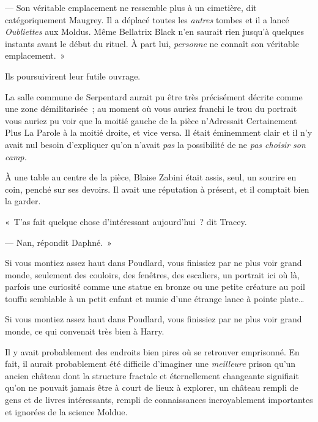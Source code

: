 --- Son véritable emplacement ne ressemble plus à un cimetière, dit catégoriquement Maugrey. Il a déplacé toutes les \emph{autres} tombes et il a lancé \emph{Oubliettes} aux Moldus. Même Bellatrix Black n'en saurait rien jusqu'à quelques instants avant le début du rituel. À part lui, \emph{personne} ne connaît son véritable emplacement.~»

Ils poursuivirent leur futile ouvrage.


La salle commune de Serpentard aurait pu être très précisément décrite comme une zone démilitarisée~; au moment où vous auriez franchi le trou du portrait vous auriez pu voir que la moitié gauche de la pièce n'Adressait Certainement Plus La Parole à la moitié droite, et vice versa. Il était éminemment clair et il n'y avait nul besoin d'expliquer qu'on n'avait \emph{pas} la possibilité de ne \emph{pas choisir son camp.}

À une table au centre de la pièce, Blaise Zabini était assis, seul, un sourire en coin, penché sur ses devoirs. Il avait une réputation à présent, et il comptait bien la garder.




«~T'as fait quelque chose d'intéressant aujourd'hui~? dit Tracey.

--- Nan, répondit Daphné.~»


Si vous montiez assez haut dans Poudlard, vous finissiez par ne plus voir grand monde, seulement des couloirs, des fenêtres, des escaliers, un portrait ici où là, parfois une curiosité comme une statue en bronze ou une petite créature au poil touffu semblable à un petit enfant et munie d'une étrange lance à pointe plate…

Si vous montiez assez haut dans Poudlard, vous finissiez par ne plus voir grand monde, ce qui convenait très bien à Harry.

Il y avait probablement des endroits bien pires où se retrouver emprisonné. En fait, il aurait probablement été difficile d'imaginer une \emph{meilleure} prison qu'un ancien château dont la structure fractale et éternellement changeante signifiait qu'on ne pouvait jamais être à court de lieux à explorer, un château rempli de gens et de livres intéressants, rempli de connaissances incroyablement importantes et ignorées de la science Moldue.

